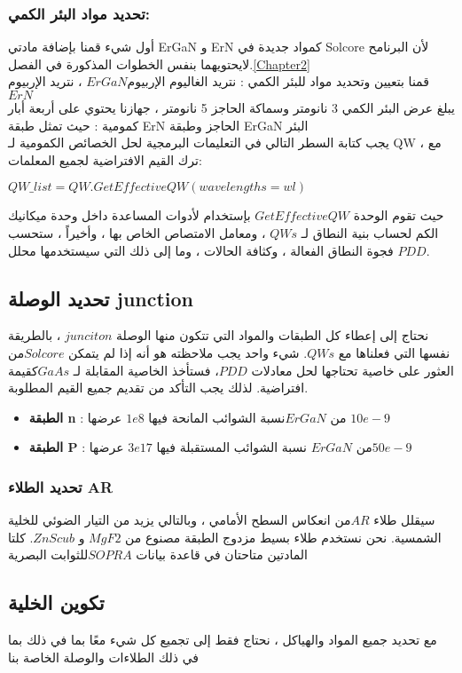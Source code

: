 \subsubsection{ تحديد مواد البئر الكمي:}
أول شيء قمنا  بإضافة مادتي ErGaN و ErN كمواد جديدة  في Solcore لأن البرنامح لايحتويهما بنفس الخطوات المذكورة في  الفصل.\ref{Chapter2}
\\
قمنا بتعيين وتحديد  مواد للبئر الكمي : نتريد الغاليوم الإربيوم$  ErGaN $ ، نتريد الإربيوم $ ErN $ \\
يبلغ عرض البئر الكمي  3 نانومتر وسماكة الحاجز   5 نانومتر  ، جهازنا يحتوي على أربعة أبار كمومية : حيث تمثل طبقة ErN الحاجز وطبقة ErGaN البئر \\
يجب كتابة السطر التالي في التعليمات البرمجية لحل  الخصائص الكمومية لـ QW ، مع ترك القيم الافتراضية لجميع المعلمات: 
\begin{flushleft}
	$ QW\_list = QW.GetEffectiveQW(wavelengths=wl) $ 
\end{flushleft}
حيث تقوم الوحدة $ GetEffectiveQW $  بإستخدام لأدوات المساعدة داخل وحدة ميكانيك الكم  لحساب بنية النطاق لـ $ QWs $ ، ومعامل الامتصاص الخاص بها ، وأخيراً ، ستحسب فجوة النطاق الفعالة ، وكثافة الحالات ، وما إلى ذلك التي سيستخدمها محلل $ PDD $. 
\subsection{ تحديد الوصلة junction }

نحتاج إلى إعطاء كل الطبقات والمواد التي تتكون منها الوصلة  $ junciton $ ، بالطريقة نفسها التي فعلناها مع $ QWs $. شيء واحد يجب ملاحظته هو أنه إذا لم يتمكن $ Solcore  $من العثور على خاصية تحتاجها لحل معادلات $ PDD  $، فستأخذ الخاصية المقابلة لـ $ GaAs  $كقيمة افتراضية. لذلك يجب التأكد من تقديم جميع القيم المطلوبة.
\begin{itemize}
	\item  \textbf{ الطبقة n} :
	من  $ ErGaN  $نسبة الشوائب   المانحة فيها $ 1e8 $  عرضها $ 10e-9 $
	\item \textbf{الطبقة P} :
	من  $ ErGaN $ نسبة الشوائب المستقبلة فيها   $ 3e17 $ عرضها$  50e-9 $
\end{itemize}
\subsubsection{ تحديد الطلاء AR }
سيقلل طلاء $ AR  $من انعكاس السطح الأمامي ، وبالتالي يزيد من التيار الضوئي للخلية الشمسية. نحن نستخدم طلاء بسيط مزدوج الطبقة مصنوع من $ MgF2 $ و  $ ZnScub $. كلتا المادتين متاحتان في قاعدة بيانات $ SOPRA  $للثوابت البصرية
\subsection{  تكوين الخلية  }
مع تحديد جميع المواد والهياكل ، نحتاج فقط إلى تجميع كل شيء معًا بما في ذلك بما في ذلك الطلاءات والوصلة الخاصة بنا 
